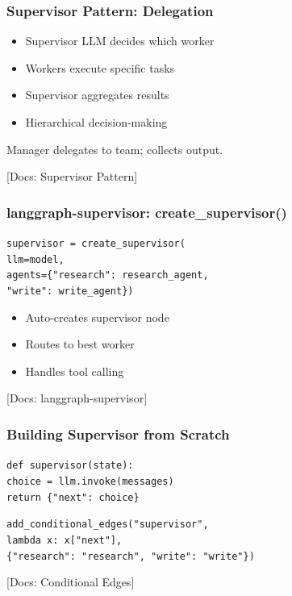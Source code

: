 \documentclass[aspectratio=169,11pt]{beamer}
\newcommand{\docref}[1]{{\scriptsize\color{docgray}[Docs: #1]}}
\begin{document}
\begin{frame}
\frametitle{Supervisor Pattern: Delegation}
\begin{conceptbox}[Architecture]
\setlength{\itemsep}{1pt}
\begin{itemize}
\item Supervisor LLM decides which worker
\item Workers execute specific tasks
\item Supervisor aggregates results
\item Hierarchical decision-making
\end{itemize}
\end{conceptbox}
\vspace{0.1cm}
\begin{tipbox}[Analogy]
Manager delegates to team; collects output.
\end{tipbox}
\docref{Supervisor Pattern}
\end{frame}

\begin{frame}
\frametitle{langgraph-supervisor: create\_supervisor()}
\begin{tipbox}
\texttt{supervisor = create\_supervisor(}\\
\texttt{llm=model,}\\
\texttt{agents=\{"research": research\_agent,}\\
\texttt{"write": write\_agent\})}
\end{tipbox}
\vspace{0.1cm}
\begin{tipbox}
\setlength{\itemsep}{1pt}
\begin{itemize}
\item Auto-creates supervisor node
\item Routes to best worker
\item Handles tool calling
\end{itemize}
\end{tipbox}
\docref{langgraph-supervisor}
\end{frame}

\begin{frame}
\frametitle{Building Supervisor from Scratch}
\begin{tipbox}
\texttt{def supervisor(state):}\\
\texttt{choice = llm.invoke(messages)}\\
\texttt{return \{"next": choice\}}
\end{tipbox}
\vspace{0.1cm}
\begin{tipbox}[Routing]
\texttt{add\_conditional\_edges("supervisor",}\\
\texttt{lambda x: x["next"],}\\
\texttt{\{"research": "research", "write": "write"\})}
\end{tipbox}
\docref{Conditional Edges}
\end{frame}
\end{document}
